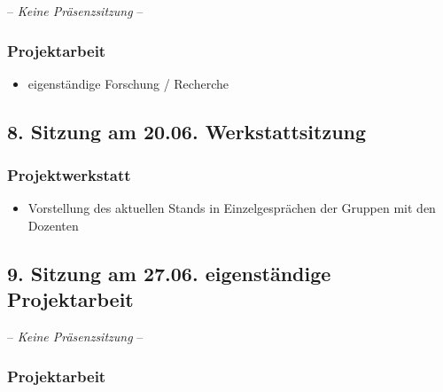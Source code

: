 \documentclass[
  ngerman,
]{article}
\providecommand{\tightlist}{%
  \setlength{\itemsep}{0pt}\setlength{\parskip}{0pt}}
\begin{document}
-- \emph{Keine Präsenzsitzung} --

\hypertarget{projektarbeit-5}{%
\subsubsection*{Projektarbeit}\label{projektarbeit-5}}

\begin{itemize}
\tightlist
\item
  eigenständige Forschung / Recherche
\end{itemize}

\hypertarget{sitzung-am-20.06.-werkstattsitzung}{%
\subsection*{8. Sitzung am 20.06. \textbar{} Werkstattsitzung}\label{sitzung-am-20.06.-werkstattsitzung}}

\hypertarget{projektwerkstatt}{%
\subsubsection*{Projektwerkstatt}\label{projektwerkstatt}}

\begin{itemize}
\tightlist
\item
  Vorstellung des aktuellen Stands in Einzelgesprächen der Gruppen mit den Dozenten
\end{itemize}

\hypertarget{sitzung-am-27.06.-eigenstuxe4ndige-projektarbeit}{%
\subsection*{9. Sitzung am 27.06. \textbar{} eigenständige Projektarbeit}\label{sitzung-am-27.06.-eigenstuxe4ndige-projektarbeit}}

-- \emph{Keine Präsenzsitzung} --

\hypertarget{projektarbeit-6}{%
\subsubsection*{Projektarbeit}\label{projektarbeit-6}}
\end{document}
